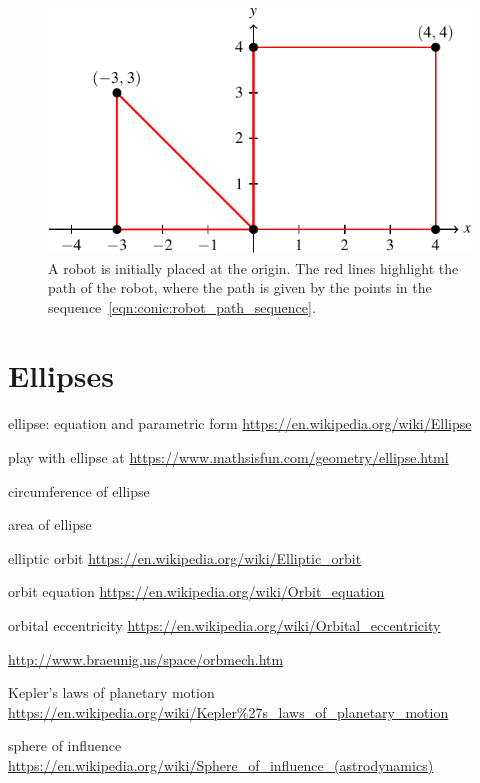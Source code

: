 \documentclass[a4paper,oneside,12pt]{article}
\begin{document}
\begin{figure}[!htbp]
\centering
\includegraphics[scale=1.1]{image/14/robot-path-square-triangle.pdf}
\caption{%
  A robot is initially placed at the origin.  The red lines highlight
  the path of the robot, where the path is given by the points in the
  sequence~\eqref{eqn:conic:robot_path_sequence}.
}
\label{fig:conic:robot_path_square_triangle}
\end{figure}




\section{Ellipses}

{\color{red}
\begin{packeditem}
\item ellipse: equation and parametric form
  \url{https://en.wikipedia.org/wiki/Ellipse}

\item play with ellipse at
  \url{https://www.mathsisfun.com/geometry/ellipse.html}

\item circumference of ellipse

\item area of ellipse

\item elliptic orbit
  \url{https://en.wikipedia.org/wiki/Elliptic_orbit}

\item orbit equation
  \url{https://en.wikipedia.org/wiki/Orbit_equation}

\item orbital eccentricity
  \url{https://en.wikipedia.org/wiki/Orbital_eccentricity}

\item \url{http://www.braeunig.us/space/orbmech.htm}

\item Kepler's laws of planetary motion
  \url{https://en.wikipedia.org/wiki/Kepler\%27s_laws_of_planetary_motion}

\item sphere of influence
  \url{https://en.wikipedia.org/wiki/Sphere_of_influence_(astrodynamics)}
\end{packeditem}
}
\end{document}
